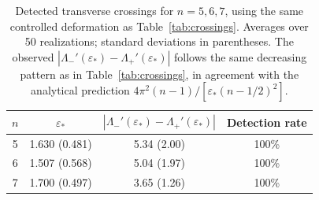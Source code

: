 \begin{table}[htbp]\centering
\caption{Detected transverse crossings for \(n=5,6,7\), using the same
controlled deformation as Table~\ref{tab:crossings}. Averages over
50 realizations; standard deviations in parentheses. The observed
\(|\Lambda_-'(\varepsilon_*)-\Lambda_+'(\varepsilon_*)|\) follows the
same decreasing pattern as in Table~\ref{tab:crossings}, in agreement with
the analytical prediction \(4\pi^{2}(n-1)/[\varepsilon_*(n-1/2)^{2}]\).}
\label{tab:high-dim}
\begin{tabular}{cccc}\hline
\(n\) & \(\varepsilon_*\) & \(|\Lambda_-'(\varepsilon_*) - \Lambda_+'(\varepsilon_*)|\) & Detection rate \\\hline
5 & 1.630 (0.481) & 5.34 (2.00) & 100\% \\
6 & 1.507 (0.568) & 5.04 (1.97) & 100\% \\
7 & 1.700 (0.497) & 3.65 (1.26) & 100\% \\
\hline\end{tabular}\end{table}